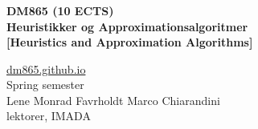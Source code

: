 \documentclass[smaller,aspectratio=169,ignorenonframetext,compress,sans,fleqn,xcolor=dvipsnames,fleqn,table,stillsansserifmath,stillsansseriftext,stillsansserifsmall,stillsansseriflarge]{beamer}
\title{}
\begin{document}
\begin{frame}[label=secondpage]%
  \frametitle{}

  {\color{myblue}
    \Large\bf        
    DM865 (10 ECTS)\\[1em]
    Heuristikker og Approximationsalgoritmer\\[0.5em]
    {\large [Heuristics and Approximation Algorithms]}\\[2em]
  }

\bigskip
\bigskip
\color{black}
\url{dm865.github.io}\\
\vfill
\bigskip
\color{black}
{\small      
Spring semester\\
Lene Monrad Favrholdt \textbullet{} Marco Chiarandini\\lektorer, IMADA\\
}


\end{frame}
\end{document}
